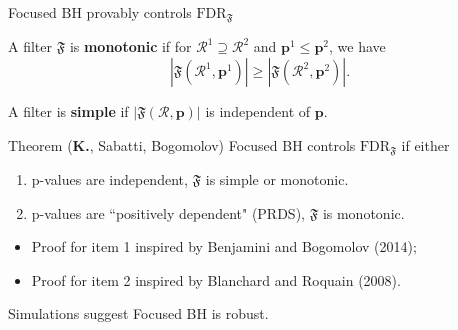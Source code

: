\documentclass{beamer}
\begin{document}
%
%
%
%
%

\begin{frame}{Focused BH provably controls $\text{FDR}_{\mathfrak F}$}
	
	A filter $\mathfrak F$ is \textbf{monotonic} if for $\mathcal R^1 \supseteq \mathcal R^2$ and $\bm p^1 \leq \bm p^2$, we have
	\begin{equation*}
	|\mathfrak F(\mathcal R^1, \bm p^1)| \geq |\mathfrak F(\mathcal R^2, \bm p^2)|.
	\end{equation*}
	
	A filter is \textbf{simple} if $|\mathfrak F(\mathcal R, \bm p)|$ is independent of $\bm p$.
	
	\begin{block}{Theorem (\textbf{K.}, Sabatti, Bogomolov)}
		Focused BH controls $\text{FDR}_{\mathfrak F}$ if either 
		\begin{enumerate}
			\item p-values are independent, $\mathfrak F$ is simple or monotonic.
			\item p-values are ``positively dependent" (PRDS), $\mathfrak F$ is monotonic.
		\end{enumerate}
		
	\end{block}	
\vspace{-0.1in}	
	\begin{itemize}
		\item Proof for item 1 inspired by Benjamini and Bogomolov (2014);
		\item Proof for item 2 inspired by Blanchard and Roquain (2008).
	\end{itemize}

	Simulations suggest Focused BH is robust.
	
	
	\end{frame}
\end{document}
